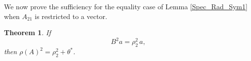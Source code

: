 \documentclass[12pt]{article}
\theoremstyle{plain}
\newtheorem{theorem}{Theorem}[section]
\numberwithin{equation}{section}
\begin{document}
		
		
		
	We now prove the sufficiency for the equality case of Lemma \ref{Spec_Rad_Sym1} when $A_{21}$ is restricted to a vector.
	\begin{theorem}\label{necessity}
		If 
		\begin{equation}\label{eq:condC}
			B^2a=\rho_2^2\,a,
		\end{equation} then  $\rho(A)^2=\rho_2^2+\theta^* $.
	\end{theorem}
\end{document}
